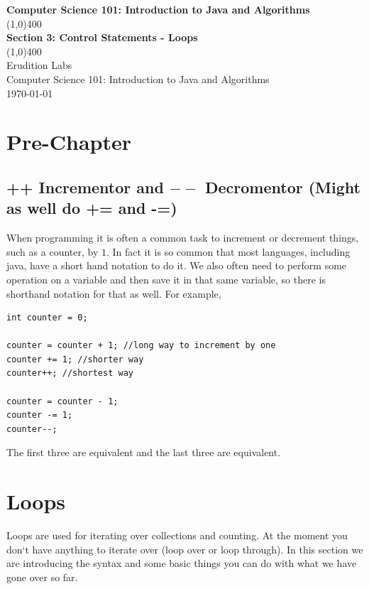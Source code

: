 \documentclass[11]{article}
\begin{document}
\begin{titlepage}
\begin{center}
\vspace{1cm}
\Large{\textbf{Computer Science 101: Introduction to Java and Algorithms}}\\
\vfill
\line(1,0){400}\\
\huge{\textbf{Section 3: Control Statements - Loops}}\\
\line(1,0){400}\\
\vfill
Erudition Labs\\
Computer Science 101: Introduction to Java and Algorithms\\
\today\\
\end{center}
\end{titlepage}

\tableofcontents
\thispagestyle{empty}
\clearpage
\setcounter{page}{1}

\section{Pre-Chapter}
\subsection{++ Incrementor and $--$ Decromentor (Might as well do += and -=)}
When programming it is often a common task to increment or decrement things, such as a counter, by $1$. In fact it is so common that most languages, including java, have a short hand notation to do it. We also often need to perform some operation on a variable and then save it in that same variable, so there is shorthand notation for that as well. For example,

\begin{lstlisting}
int counter = 0;

counter = counter + 1; //long way to increment by one
counter += 1; //shorter way
counter++; //shortest way

counter = counter - 1;
counter -= 1;
counter--;
\end{lstlisting}

The first three are equivalent and the last three are equivalent.
\section{Loops}
Loops are used for iterating over collections and counting. At the moment you don`t have anything to iterate over (loop over or loop through). In this section we are introducing the syntax and some basic things you can do with what we have gone over so far.
\end{document}
